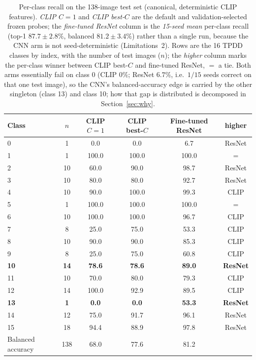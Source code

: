 \documentclass[10pt,a4paper]{article}
\begin{document}
\begin{table}[!ht]
\centering
\caption{Per-class recall on the 138-image test set (canonical, deterministic CLIP features). \emph{CLIP $C{=}1$} and \emph{CLIP best-$C$} are the default and validation-selected frozen probes; the \emph{fine-tuned ResNet} column is the \emph{15-seed mean} per-class recall (top-1 $87.7 \pm 2.8\%$, balanced $81.2 \pm 3.4\%$) rather than a single run, because the CNN arm is not seed-deterministic (Limitations~2). Rows are the 16 TPDD classes by index, with the number of test images ($n$); the \emph{higher} column marks the per-class winner between CLIP best-$C$ and fine-tuned ResNet, $=$ a tie. Both arms essentially fail on class 0 (CLIP $0\%$; ResNet $6.7\%$, i.e.\ $1/15$ seeds correct on that one test image), so the CNN's balanced-accuracy edge is carried by the other singleton (class 13) and class 10; how that gap is distributed is decomposed in Section~\ref{sec:why}.}
\label{tab:perclass}
\begin{tabular}{lccccc}
\toprule
Class & $n$ & CLIP $C{=}1$ & CLIP best-$C$ & Fine-tuned ResNet & higher \\
\midrule
0 & 1 & 0.0 & 0.0 & 6.7 & ResNet \\
1 & 1 & 100.0 & 100.0 & 100.0 & $=$ \\
2 & 10 & 60.0 & 90.0 & 98.7 & ResNet \\
3 & 10 & 80.0 & 80.0 & 92.7 & ResNet \\
4 & 10 & 90.0 & 100.0 & 99.3 & CLIP \\
5 & 1 & 100.0 & 100.0 & 100.0 & $=$ \\
6 & 10 & 100.0 & 100.0 & 96.7 & CLIP \\
7 & 8 & 25.0 & 75.0 & 53.3 & CLIP \\
8 & 10 & 90.0 & 90.0 & 85.3 & CLIP \\
9 & 8 & 25.0 & 75.0 & 60.8 & CLIP \\
\textbf{10} & \textbf{14} & \textbf{78.6} & \textbf{78.6} & \textbf{89.0} & \textbf{ResNet} \\
11 & 10 & 70.0 & 80.0 & 79.3 & CLIP \\
12 & 14 & 100.0 & 92.9 & 89.5 & CLIP \\
\textbf{13} & \textbf{1} & \textbf{0.0} & \textbf{0.0} & \textbf{53.3} & \textbf{ResNet} \\
14 & 12 & 75.0 & 91.7 & 96.1 & ResNet \\
15 & 18 & 94.4 & 88.9 & 97.8 & ResNet \\
Balanced accuracy & 138 & 68.0 & 77.6 & 81.2 & \\
\bottomrule
\end{tabular}
\end{table}
\end{document}
